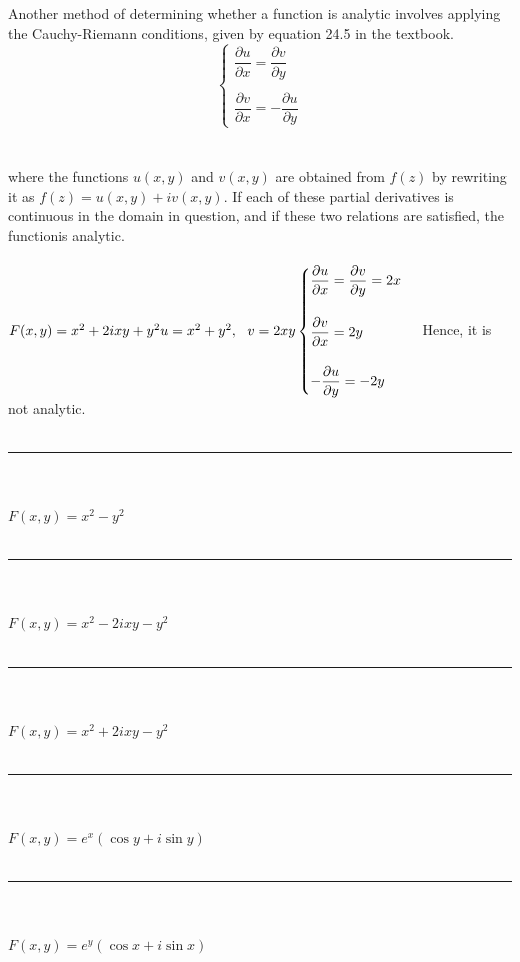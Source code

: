 \documentclass[fleqn]{article}
\begin{document}
\begin{enumerate}
    \textcolor{hwColor}{
      Another method of determining whether a function is analytic involves 
      applying the Cauchy-Riemann conditions, given by equation 24.5 in the textbook.
      $$\begin{cases}
        \dfrac{\partial u}{\partial x}=\dfrac{\partial v}{\partial y} \\
        \\
        \dfrac{\partial v}{\partial x}=-\dfrac{\partial u}{\partial y}
      \end{cases}$$
      \\
      \\
      where the functions $u(x, y)$ and $v(x, y)$ are obtained from $f(z)$ by rewriting it as 
      $f(z) =u(x, y) +iv(x, y)$. If each of these partial derivatives is continuous in the domain
      in question, and if these two relations are satisfied, the functionis analytic. \\
      \\
      $
        F(x,y)=x^2+2ixy+y^2 \\
        \\
        u=x^2+y^2, ~~ v=2xy \\
        \\
        \begin{cases}
          \dfrac{\partial u}{\partial x}=\dfrac{\partial v}{\partial y}=2x \\
          \\
          \dfrac{\partial v}{\partial x}=2y \\
          \\
          -\dfrac{\partial u}{\partial y}=-2y
        \end{cases}
      $
      Hence, it is not analytic. 
      \\
      \\
      \rule{15cm}{1pt}
      \\
      \\
      $
        F(x,y)=x^2-y^2
      $
      \\
      \\
      \rule{15cm}{1pt}
      \\
      \\
      $
        F(x,y)=x^2-2ixy-y^2
      $
      \\
      \\
      \rule{15cm}{1pt}
      \\
      \\
      $
        F(x,y)=x^2+2ixy-y^2
      $
      \\
      \\
      \rule{15cm}{1pt}
      \\
      \\
      $
        F(x,y)=e^x(\cos y+i \sin y)
      $
      \\
      \\
      \rule{15cm}{1pt}
      \\
      \\
      $
        F(x,y)=e^y(\cos x+i \sin x)
      $
    }
    
  \end{enumerate}
\end{document}
